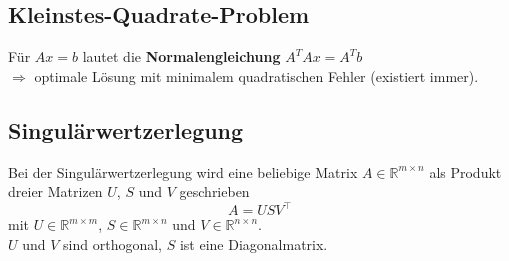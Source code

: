 \documentclass[6pt,a4paper]{scrartcl}
\begin{document}
\begin{multicols*}{4}
\subsection{Kleinstes-Quadrate-Problem}
Für $Ax = b$ lautet die
\textbf{Normalengleichung}
$A^TAx = A^Tb$\\
$\Rightarrow$ optimale Lösung mit minimalem quadratischen Fehler (existiert immer).

\subsection{Singulärwertzerlegung}
Bei der Singulärwertzerlegung wird eine beliebige Matrix $A\in \mathbb{R}^{m\times n}$ als Produkt dreier Matrizen $U$, $S$ und $V$ geschrieben
\begin{equation*}
A=USV^\top
\end{equation*}
mit $U\in \mathbb{R}^{m\times m}$, $S\in \mathbb{R}^{m\times n}$ und $V\in \mathbb{R}^{n\times n}$.\\
$U$ und $V$ sind orthogonal, $S$ ist eine Diagonalmatrix.

\end{multicols*}
\end{document}
